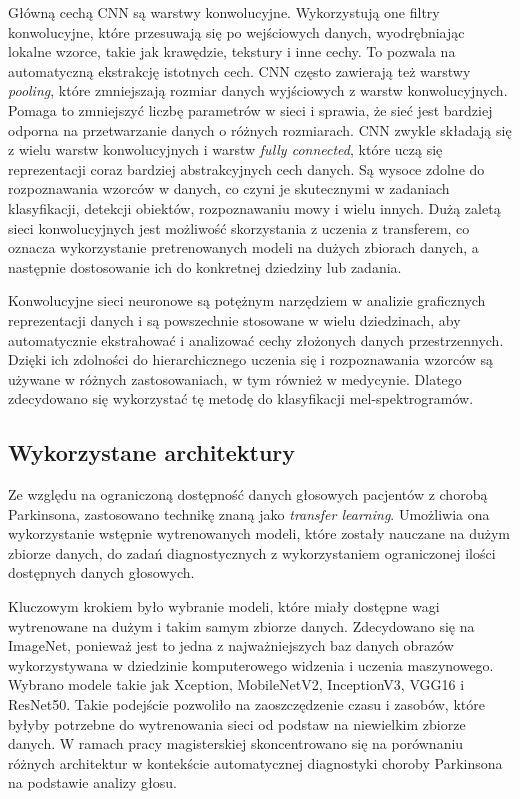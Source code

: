 Główną cechą CNN są warstwy konwolucyjne.
Wykorzystują one filtry konwolucyjne, które przesuwają się po wejściowych danych, wyodrębniając lokalne wzorce, takie jak krawędzie, tekstury i inne cechy.
To pozwala na automatyczną ekstrakcję istotnych cech.
CNN często zawierają też warstwy \emph{pooling}, które zmniejszają rozmiar danych wyjściowych z warstw konwolucyjnych.
Pomaga to zmniejszyć liczbę parametrów w sieci i sprawia, że sieć jest bardziej odporna na przetwarzanie danych o różnych rozmiarach.
CNN zwykle składają się z wielu warstw konwolucyjnych i warstw \emph{fully connected}, które uczą się reprezentacji coraz bardziej abstrakcyjnych cech danych.
Są wysoce zdolne do rozpoznawania wzorców w danych, co czyni je skutecznymi w zadaniach klasyfikacji, detekcji obiektów, rozpoznawaniu mowy i wielu innych.
Dużą zaletą sieci konwolucyjnych jest możliwość skorzystania z uczenia z transferem, co oznacza wykorzystanie pretrenowanych modeli na dużych zbiorach danych, a następnie dostosowanie ich do konkretnej dziedziny lub zadania.

Konwolucyjne sieci neuronowe są potężnym narzędziem w analizie graficznych reprezentacji danych i są powszechnie stosowane w wielu dziedzinach, aby automatycznie ekstrahować i analizować cechy złożonych danych przestrzennych.
Dzięki ich zdolności do hierarchicznego uczenia się i rozpoznawania wzorców są używane w różnych zastosowaniach, w tym również w medycynie.
Dlatego zdecydowano się wykorzystać tę metodę do klasyfikacji mel-spektrogramów.

\subsection{Wykorzystane architektury}
\label{subsec:architektury}

Ze względu na ograniczoną dostępność danych głosowych pacjentów z chorobą Parkinsona, zastosowano technikę znaną jako \emph{transfer learning}.
Umożliwia ona wykorzystanie wstępnie wytrenowanych modeli, które zostały nauczane na dużym zbiorze danych,
do zadań diagnostycznych z wykorzystaniem ograniczonej ilości dostępnych danych głosowych.

Kluczowym krokiem było wybranie modeli, które miały dostępne wagi wytrenowane na dużym i takim samym zbiorze danych.
Zdecydowano się na ImageNet, ponieważ jest to jedna z najważniejszych baz danych obrazów wykorzystywana w dziedzinie komputerowego widzenia i uczenia maszynowego.
Wybrano modele takie jak Xception, MobileNetV2, InceptionV3, VGG16 i ResNet50.
Takie podejście pozwoliło na zaoszczędzenie czasu i zasobów, które byłyby potrzebne do wytrenowania sieci od podstaw na niewielkim zbiorze danych.
W ramach pracy magisterskiej skoncentrowano się na porównaniu różnych architektur w kontekście automatycznej diagnostyki choroby Parkinsona na podstawie analizy głosu.

